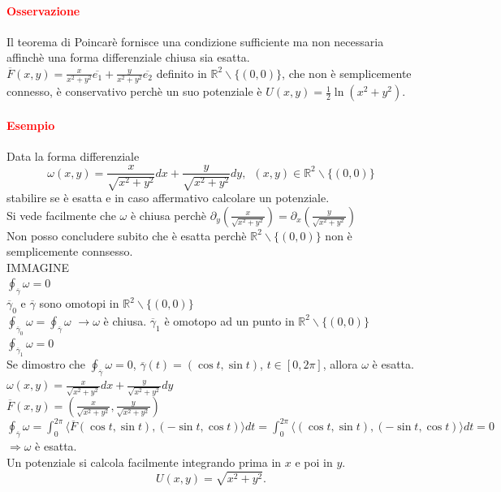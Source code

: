 \documentclass{article}
\newcommand{\R}{\mathbb{R}}
\begin{document}
\paragraph{\textcolor{red}{Osservazione}}
Il teorema di Poincarè fornisce una condizione sufficiente ma non necessaria affinchè una forma differenziale chiusa sia esatta.\\
$\overline{F}(x,y)=\frac{x}{x^2+y^2}\overline{e_1}+\frac{y}{x^2+y^2}\overline{e_2}$ definito in $\R^2 \backslash \{(0,0)\}$, che non è semplicemente connesso, è conservativo perchè un suo potenziale è $ U(x,y)=\frac{1}{2}\ln (x^2+y^2)$.

\paragraph{\textcolor{red}{Esempio}}
Data la forma differenziale 
\begin{equation*}
    \omega(x,y)=\frac{x}{\sqrt{x^2+y^2}}dx + \frac{y}{\sqrt{x^2+y^2}}dy,\,\,\, (x,y)\in \R^2 \backslash \{(0,0)\}
\end{equation*}
stabilire se è esatta e in caso affermativo calcolare un potenziale.\\
Si vede facilmente che $\omega$ è chiusa perchè $\partial_y\left(\frac{x}{\sqrt{x^2+y^2}}\right)=\partial_x\left(\frac{y}{\sqrt{x^2+y^2}}\right)$\\
Non posso concludere subito che è esatta perchè $\R^2 \backslash \{(0,0)\}$ non è semplicemente connsesso.\\
IMMAGINE\\
$\oint_{\overline{\gamma}}\omega=0$\\
$\overline{\gamma}_0$ e $\overline{\gamma}$ sono omotopi in $\R^2\backslash \{(0,0)\}$\\
$\oint_{\overline{\gamma}_0}\omega=\oint_{\overline{\gamma}}\omega$ $\rightarrow \omega$ è chiusa.
$\overline{\gamma}_1$ è omotopo ad un punto in $\R^2 \backslash \{(0,0)\}$\\
$\oint_{\overline{\gamma}_1}\omega=0$\\
Se dimostro che $\oint_{\overline{\gamma}}\omega=0$, $\overline{\gamma}(t)=(\cos t , \sin t)$, $t \in [0,2\pi]$, allora $\omega$ è esatta.\\
$\omega(x,y)=\frac{x}{\sqrt{x^2+y^2}}dx + \frac{y}{\sqrt{x^2+y^2}}dy$\\
$\overline{F}(x,y)=\left( \frac{x}{\sqrt{x^2+y^2}}, \frac{y}{\sqrt{x^2+y^2}} \right)$\\
$\oint_{\overline{\gamma}}\omega =\int_0^{2\pi} \langle \overline{F}(\cos t,\sin t),(-\sin t, \cos t) \rangle dt = \int_0^{2\pi}\langle (\cos t, \sin t),(-\sin t, \cos t) \rangle dt =0$\\
$\Rightarrow \omega$ è esatta.\\
Un potenziale si calcola facilmente integrando prima in $x$ e poi in $y$.
\begin{equation*}
    U(x,y)=\sqrt{x^2+y^2}.
\end{equation*}
\end{document}
